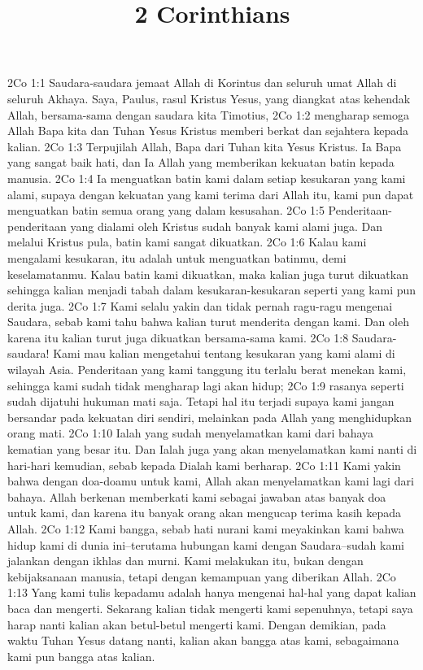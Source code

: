 

\title{2 Corinthians}

2Co 1:1  Saudara-saudara jemaat Allah di Korintus dan seluruh umat Allah di seluruh Akhaya. Saya, Paulus, rasul Kristus Yesus, yang diangkat atas kehendak Allah, bersama-sama dengan saudara kita Timotius,
2Co 1:2  mengharap semoga Allah Bapa kita dan Tuhan Yesus Kristus memberi berkat dan sejahtera kepada kalian.
2Co 1:3  Terpujilah Allah, Bapa dari Tuhan kita Yesus Kristus. Ia Bapa yang sangat baik hati, dan Ia Allah yang memberikan kekuatan batin kepada manusia.
2Co 1:4  Ia menguatkan batin kami dalam setiap kesukaran yang kami alami, supaya dengan kekuatan yang kami terima dari Allah itu, kami pun dapat menguatkan batin semua orang yang dalam kesusahan.
2Co 1:5  Penderitaan-penderitaan yang dialami oleh Kristus sudah banyak kami alami juga. Dan melalui Kristus pula, batin kami sangat dikuatkan.
2Co 1:6  Kalau kami mengalami kesukaran, itu adalah untuk menguatkan batinmu, demi keselamatanmu. Kalau batin kami dikuatkan, maka kalian juga turut dikuatkan sehingga kalian menjadi tabah dalam kesukaran-kesukaran seperti yang kami pun derita juga.
2Co 1:7  Kami selalu yakin dan tidak pernah ragu-ragu mengenai Saudara, sebab kami tahu bahwa kalian turut menderita dengan kami. Dan oleh karena itu kalian turut juga dikuatkan bersama-sama kami.
2Co 1:8  Saudara-saudara! Kami mau kalian mengetahui tentang kesukaran yang kami alami di wilayah Asia. Penderitaan yang kami tanggung itu terlalu berat menekan kami, sehingga kami sudah tidak mengharap lagi akan hidup;
2Co 1:9  rasanya seperti sudah dijatuhi hukuman mati saja. Tetapi hal itu terjadi supaya kami jangan bersandar pada kekuatan diri sendiri, melainkan pada Allah yang menghidupkan orang mati.
2Co 1:10  Ialah yang sudah menyelamatkan kami dari bahaya kematian yang besar itu. Dan Ialah juga yang akan menyelamatkan kami nanti di hari-hari kemudian, sebab kepada Dialah kami berharap.
2Co 1:11  Kami yakin bahwa dengan doa-doamu untuk kami, Allah akan menyelamatkan kami lagi dari bahaya. Allah berkenan memberkati kami sebagai jawaban atas banyak doa untuk kami, dan karena itu banyak orang akan mengucap terima kasih kepada Allah.
2Co 1:12  Kami bangga, sebab hati nurani kami meyakinkan kami bahwa hidup kami di dunia ini--terutama hubungan kami dengan Saudara--sudah kami jalankan dengan ikhlas dan murni. Kami melakukan itu, bukan dengan kebijaksanaan manusia, tetapi dengan kemampuan yang diberikan Allah.
2Co 1:13  Yang kami tulis kepadamu adalah hanya mengenai hal-hal yang dapat kalian baca dan mengerti. Sekarang kalian tidak mengerti kami sepenuhnya, tetapi saya harap nanti kalian akan betul-betul mengerti kami. Dengan demikian, pada waktu Tuhan Yesus datang nanti, kalian akan bangga atas kami, sebagaimana kami pun bangga atas kalian.
